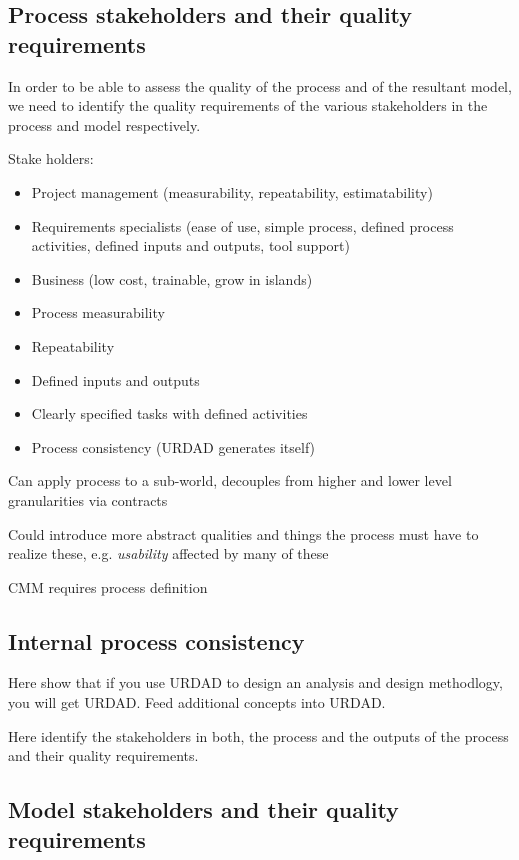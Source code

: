 \subsection{Process stakeholders and their quality requirements}

In order to be able to assess the quality of the process and of the resultant model, we need to identify the quality requirements of the various stakeholders in the process and model respectively.


\cite{berard_what_1995}

Stake holders:
\begin{itemize}
  \item Project management (measurability, repeatability, estimatability)
  \item Requirements specialists (ease of use, simple process, defined process activities, defined inputs and outputs, tool support)
  \item Business (low cost, trainable, grow in islands)
\end{itemize}


\begin{itemize}
  \item Process measurability
  \item Repeatability
  \item Defined inputs and outputs
  \item Clearly specified tasks with defined activities
  \item Process consistency (URDAD generates itself)
\end{itemize}

Can apply process to a sub-world, decouples from higher and lower level granularities via contracts

Could introduce more abstract qualities and things the process must have to realize these, e.g. \emph{usability} affected by many of these

CMM requires process definition


\subsection{Internal process consistency}


Here show that if you use URDAD to design an analysis and design methodlogy, you will get URDAD. Feed additional concepts into URDAD.

Here identify the stakeholders in both, the process and the outputs of the process and their quality requirements.

\subsection{Model stakeholders and their quality requirements}